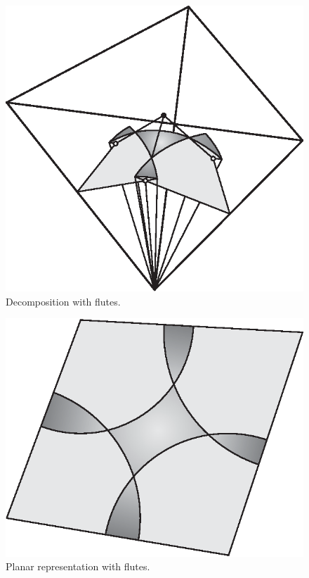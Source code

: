 \begin{figure}
\begin{center}
\includegraphics{PS/decomp3}
\end{center}
\caption{Decomposition with flutes.}
\label{fig:decomp3}
\end{figure}

\begin{figure}
\begin{center}
\includegraphics{PS/planar3}
\end{center}
\caption{Planar representation with flutes.}
\label{fig:planar3}
\end{figure}

